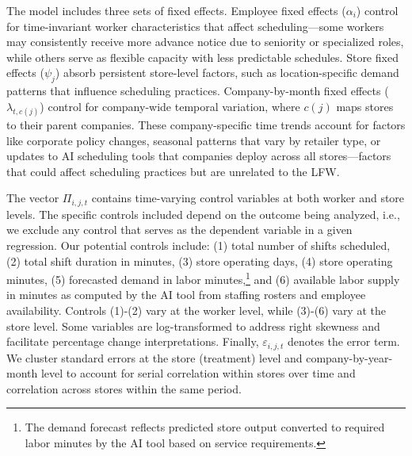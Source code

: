 \documentclass[letterpaper,11pt,leqno]{article}
\theoremstyle{paper}
\begin{document}
The model includes three sets of fixed effects. Employee fixed effects ($\alpha_i$) control for time-invariant worker characteristics that affect scheduling—some workers may consistently receive more advance notice due to seniority or specialized roles, while others serve as flexible capacity with less predictable schedules. Store fixed effects ($\psi_j$) absorb persistent store-level factors, such as location-specific demand patterns that influence scheduling practices. Company-by-month fixed effects ($\lambda_{t,c(j)}$) control for company-wide temporal variation, where $c(j)$ maps stores to their parent companies. These company-specific time trends account for factors like corporate policy changes, seasonal patterns that vary by retailer type, or updates to AI scheduling tools that companies deploy across all stores—factors that could affect scheduling practices but are unrelated to the LFW.

The vector $\Pi_{i,j,t}$ contains time-varying control variables at both worker and store levels. The specific controls included depend on the outcome being analyzed, i.e., we exclude any control that serves as the dependent variable in a given regression. Our potential controls include: (1) total number of shifts scheduled, (2) total shift duration in minutes, (3) store operating days, (4) store operating minutes, (5) forecasted demand in labor minutes,\footnote{The demand forecast reflects predicted store output converted to required labor minutes by the AI tool based on service requirements.} and (6) available labor supply in minutes as computed by the AI tool from staffing rosters and employee availability. Controls (1)-(2) vary at the worker level, while (3)-(6) vary at the store level. Some variables are log-transformed to address right skewness and facilitate percentage change interpretations. Finally, $\varepsilon_{i,j,t}$ denotes the error term. We cluster standard errors at the store (treatment) level and company-by-year-month level to account for serial correlation within stores over time and correlation across stores within the same period.
\end{document}

